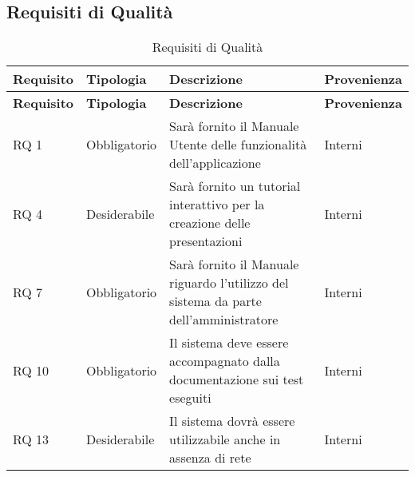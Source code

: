 \subsection{Requisiti di Qualità}{ 
\renewcommand*{\arraystretch}{1.4} 
\begin{longtable} [c]{| p{2.5cm} | p{2.5cm} | p{6cm} |p{2.5cm}|} 
\caption{Requisiti di Qualità \label{tab:reqQualita}}\\ \hline\textbf{Requisito} & \textbf{Tipologia} & \textbf{Descrizione} & \textbf{Provenienza} \\ 
\hline \endfirsthead \hline 
\textbf{Requisito} & \textbf{Tipologia} & \textbf{Descrizione} & \textbf{Provenienza} \\ 
\hline \endhead \hline \endfoot \hline \endlastfoot 
RQ 1 & Obbligatorio & Sarà fornito il Manuale Utente delle funzionalità dell'applicazione & Interni\\ 
 \hline 
RQ 4 & Desiderabile & Sarà fornito un tutorial interattivo per la creazione delle presentazioni & Interni\\ 
 \hline 
RQ 7 & Obbligatorio & Sarà fornito il Manuale riguardo l'utilizzo del sistema da parte dell'amministratore & Interni\\ 
 \hline 
RQ 10 & Obbligatorio & Il sistema deve essere accompagnato dalla documentazione sui test eseguiti & Interni\\ 
 \hline 
RQ 13 & Desiderabile & Il sistema dovrà essere utilizzabile anche in assenza di rete & Interni\\ 
 \hline 
\end{longtable}}